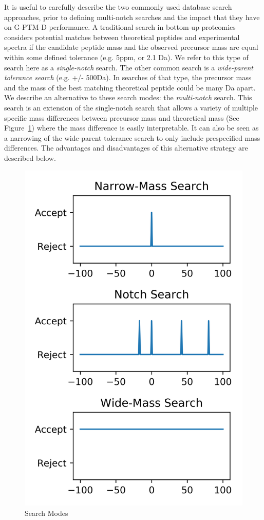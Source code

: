 \documentclass[journal=jprobs,manuscript=article]{achemso}
\begin{document}
It is useful to carefully describe the two commonly used database search approaches, prior to defining multi-notch searches and the impact that they have on G-PTM-D performance.
A traditional search in bottom-up proteomics considers potential matches between theoretical peptides and experimental spectra if the candidate peptide mass and the observed precursor mass are equal within some defined tolerance (e.g. 5ppm, or 2.1 Da).
We refer to this type of search here as a \textit{single-notch} search.
The other common search is a \textit{wide-parent tolerance search} (e.g. +/- 500Da)\citep{Chick_2015,Kong_2017,Li_2016}.
In searches of that type, the precursor mass and the mass of the best matching theoretical peptide could be many Da apart.
We describe an alternative to these search modes: the \textit{multi-notch} search.
This search is an extension of the single-notch search that allows a variety of multiple specific mass differences between precursor mass and theoretical mass (See Figure~\ref{fig:fig3-searchTypes}) where the mass difference is easily interpretable.
It can also be seen as a narrowing of the wide-parent tolerance search to only include prespecified mass differences.
The advantages and disadvantages of this alternative strategy are described below.

\begin{figure}[H]
\includegraphics{fig3-searchTypes.png}
\caption{Search Modes}
\label{fig:fig3-searchTypes}
\end{figure}
\end{document}
